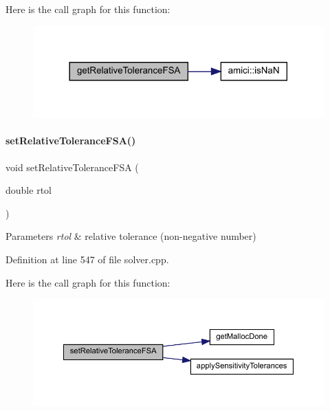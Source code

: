Here is the call graph for this function\+:
\nopagebreak
\begin{figure}[H]
\begin{center}
\leavevmode
\includegraphics[width=317pt]{classamici_1_1_solver_acf203e64c34e2d20a6fd563029c19b57_cgraph}
\end{center}
\end{figure}
\mbox{\label{classamici_1_1_solver_af82e072706f6bc6819c154b86bec309f}} 
\paragraph{\texorpdfstring{setRelativeToleranceFSA()}{setRelativeToleranceFSA()}}
{\footnotesize\ttfamily void set\+Relative\+Tolerance\+F\+SA (\begin{DoxyParamCaption}\item[{double}]{rtol }\end{DoxyParamCaption})}


\begin{DoxyParams}{Parameters}
{\em rtol} & relative tolerance (non-\/negative number) \\
\hline
\end{DoxyParams}


Definition at line 547 of file solver.\+cpp.

Here is the call graph for this function\+:
\nopagebreak
\begin{figure}[H]
\begin{center}
\leavevmode
\includegraphics[width=350pt]{classamici_1_1_solver_af82e072706f6bc6819c154b86bec309f_cgraph}
\end{center}
\end{figure}
\mbox{\label{classamici_1_1_solver_ac4b72ec37a7ab41b520b5c540a382165}} 
